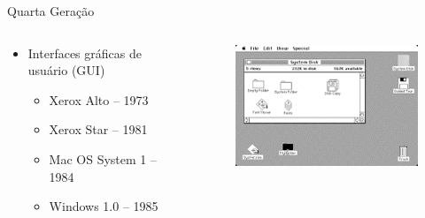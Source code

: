 \documentclass[aspectratio=169,
				xcolor=table]{beamer}
\begin{document}
	\begin{frame}[t]{Quarta Geração}
		\begin{columns}[t]
			\begin{column}{0.5\textwidth}
				\begin{itemize}
					\item Interfaces gráficas de usuário (GUI)
					\begin{itemize}
						\item Xerox Alto – 1973 
						\item Xerox Star – 1981  
						\item Mac OS System 1 – 1984
						\item Windows 1.0 – 1985 
					\end{itemize}
				\end{itemize}
			\end{column}
			\begin{column}{0.5\textwidth}
				\begin{figure}
					\centering
					\includegraphics[width=\textwidth, keepaspectratio]{../figs/cap03/geracao44} 			
				\end{figure}
			\end{column}
		\end{columns}
	\end{frame}
\end{document}
